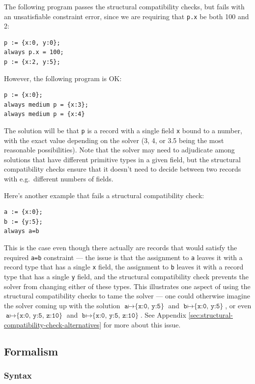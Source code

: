 \documentclass{article}
\begin{document}
The following program passes the structural compatibility checks, but
fails with an unsatisfiable constraint error, since we are requiring
that \verb|p.x| be both 100 and 2:
\begin{verbatim}  
p := {x:0, y:0};
always p.x = 100;
p := {x:2, y:5};
\end{verbatim}

However, the following program is OK:
\begin{verbatim} 
p := {x:0};
always medium p = {x:3};
always medium p = {x:4}
\end{verbatim}
The solution will be that \verb|p| is a record with a single field
\verb|x| bound to a number, with the exact value depending on the
solver (3, 4, or 3.5 being the most reasonable possibilities).  Note
that the solver may need to adjudicate among solutions that have
different primitive types in a given field, but the structural
compatibility checks ensure that it doesn't need to decide between
two records with e.g.\ different numbers of fields.

Here's another example that fails a structural compatibility check:
\begin{verbatim}
a := {x:0};
b := {y:5};
always a=b
\end{verbatim}

This is the case even though there actually are records that would
satisfy the required \verb|a=b| constraint --- the issue is that the assignment
to \verb|a| leaves it with a record type that has a single \verb|x|
field, the assignment to \verb|b| leaves it with a record type that
has a single \verb|y| field, and the structural compatibility check
prevents the solver from changing either of these types.  This
illustrates one aspect of using the structural compatibility checks to
tame the solver --- one could otherwise imagine the solver coming up
with the solution 
$\texttt{a} \mapsto \texttt{\{x:0, y:5\}}$ and
$\texttt{b} \mapsto \texttt{\{x:0, y:5\}}$, or even
$\texttt{a} \mapsto \texttt{\{x:0, y:5, z:10\}}$ and
$\texttt{b} \mapsto \texttt{\{x:0, y:5, z:10\}}$.  See Appendix 
\ref{sec:structural-compatibility-check-alternatives} for more about
this issue.

\subsection{Formalism}

\subsubsection{Syntax}
\end{document}
